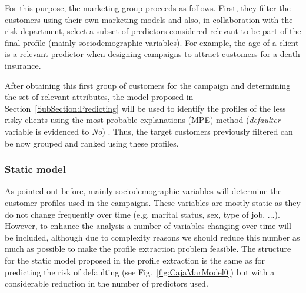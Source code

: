 For this purpose, the marketing group proceeds as follows. First, they filter the customers using their own marketing models and also, in collaboration with the risk department, select a subset of predictors considered relevant to be part of the final profile (mainly sociodemographic variables). For example, the age of a client is a relevant predictor when designing campaigns to attract customers for a death insurance. 

After obtaining this first group of customers for the campaign and determining the set of relevant attributes, the model proposed in Section~\ref{SubSection:Predicting} will be used to identify the profiles of the less risky clients using the most probable explanations (MPE) method (\emph{defaulter} variable is evidenced to \emph{No}) . Thus, the target customers previously filtered can be now grouped and ranked using these profiles.


\subsubsection*{Static model}
\label{sec:StaticModel}

As pointed out before, mainly sociodemographic variables will determine the customer profiles used in the campaigns. These variables are mostly static as they do not change frequently over time (e.g. marital status, sex, type of job, ...). However, to enhance the analysis a number of  variables changing over time will be included, although due to complexity reasons we should reduce this number as much as possible to make the profile extraction problem feasible.
The structure for the static model proposed in the profile extraction is the same as for predicting the risk of defaulting (see Fig.~\ref{fig:CajaMarModel0}) but with a considerable reduction in the number of predictors used. 




